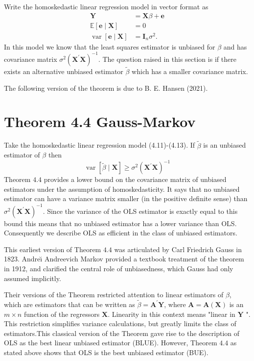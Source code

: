 \documentclass[10pt]{article}
\begin{document}
Write the homoskedastic linear regression model in vector format as
$$
\begin{aligned}
\boldsymbol{Y} &=\boldsymbol{X} \beta+\boldsymbol{e} \\
\mathbb{E}[\boldsymbol{e} \mid \boldsymbol{X}] &=0 \\
\operatorname{var}[\boldsymbol{e} \mid \boldsymbol{X}] &=\boldsymbol{I}_{n} \sigma^{2} .
\end{aligned}
$$
In this model we know that the least squares estimator is unbiased for $\beta$ and has covariance matrix $\sigma^{2}\left(\boldsymbol{X}^{\prime} \boldsymbol{X}\right)^{-1}$. The question raised in this section is if there exists an alternative unbiased estimator $\widetilde{\beta}$ which has a smaller covariance matrix.

The following version of the theorem is due to B. E. Hansen (2021).

\section{Theorem 4.4 Gauss-Markov}
Take the homoskedastic linear regression model (4.11)-(4.13). If $\widetilde{\beta}$ is an unbiased estimator of $\beta$ then
$$
\operatorname{var}[\widetilde{\beta} \mid \boldsymbol{X}] \geq \sigma^{2}\left(\boldsymbol{X}^{\prime} \boldsymbol{X}\right)^{-1}
$$
Theorem $4.4$ provides a lower bound on the covariance matrix of unbiased estimators under the assumption of homoskedasticity. It says that no unbiased estimator can have a variance matrix smaller (in the positive definite sense) than $\sigma^{2}\left(\boldsymbol{X}^{\prime} \boldsymbol{X}\right)^{-1}$. Since the variance of the OLS estimator is exactly equal to this bound this means that no unbiased estimator has a lower variance than OLS. Consequently we describe OLS as efficient in the class of unbiased estimators.

This earliest version of Theorem $4.4$ was articulated by Carl Friedrich Gauss in 1823. Andreı̆ Andreevich Markov provided a textbook treatment of the theorem in 1912, and clarified the central role of unbiasedness, which Gauss had only assumed implicitly.

Their versions of the Theorem restricted attention to linear estimators of $\beta$, which are estimators that can be written as $\widetilde{\beta}=\boldsymbol{A}^{\prime} \boldsymbol{Y}$, where $\boldsymbol{A}=\boldsymbol{A}(\boldsymbol{X})$ is an $m \times n$ function of the regressors $\boldsymbol{X}$. Linearity in this context means "linear in $\boldsymbol{Y}$ ". This restriction simplifies variance calculations, but greatly limits the class of estimators.This classical version of the Theorem gave rise to the description of OLS as the best linear unbiased estimator (BLUE). However, Theorem $4.4$ as stated above shows that OLS is the best unbiased estimator (BUE).
\end{document}

